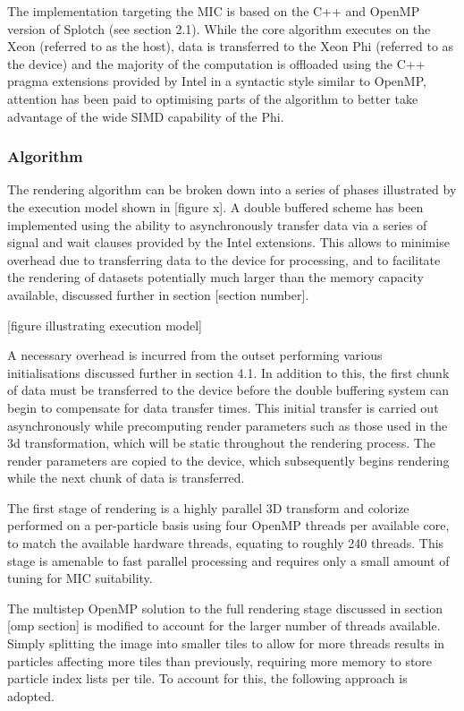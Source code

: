 \documentclass[runningheads,a4paper]{llncs}
\begin{document}
The implementation targeting the MIC is based on the C++ and OpenMP version of Splotch (see section 2.1). 
While the core algorithm executes on the Xeon (referred to as the host), data is transferred to the Xeon Phi (referred 
to as the device) and the majority of the computation is offloaded using the C++ pragma extensions provided by Intel 
in a syntactic style similar to OpenMP, attention has been paid to optimising parts of the algorithm to better take 
advantage of the wide SIMD capability of the Phi.


\subsubsection{Algorithm}
\label{sect:micalgorithm}

The rendering algorithm can be broken down into a series of phases illustrated by the execution model shown in [figure x]. 
A double buffered scheme has been implemented using the ability to asynchronously transfer data via a series of signal 
and wait clauses provided by the Intel extensions. This allows to minimise overhead due to transferring data to the device 
for processing, and to facilitate the rendering of datasets potentially much larger than the memory capacity available, 
discussed further in section [section number].

\medskip
\centerline{[figure illustrating execution model]}
\medskip
A necessary overhead is incurred from the outset performing various initialisations discussed further in section 4.1. In 
addition to this, the first chunk of data must be transferred to the device before the double buffering system can begin 
to compensate for data transfer times. This initial transfer is carried out asynchronously while precomputing render 
parameters such as those used in the 3d transformation, which will be static throughout the rendering process. The render 
parameters are copied to the device, which subsequently begins rendering while the next chunk of data is transferred.

The first stage of rendering is a highly parallel 3D transform and colorize performed on a per-particle basis using 
four OpenMP threads per available core, to match the available hardware threads, equating to roughly 240 threads. This 
stage is amenable to fast parallel processing and requires only a small amount of tuning for MIC suitability.

The multistep OpenMP solution to the full rendering stage discussed in section [omp section] is modified to account for 
the larger number of threads available. Simply splitting the image into smaller tiles to allow for more threads results 
in particles affecting more tiles than previously, requiring more memory to store particle index lists per tile. To 
account for this, the following approach is adopted. 
\end{document}
